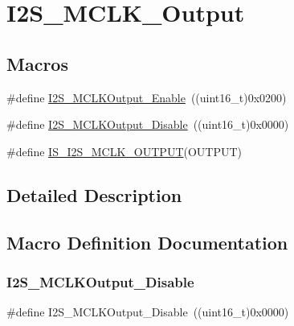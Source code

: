 \hypertarget{group___i2_s___m_c_l_k___output}{}\section{I2\+S\+\_\+\+M\+C\+L\+K\+\_\+\+Output}
\label{group___i2_s___m_c_l_k___output}
\subsection*{Macros}
\begin{DoxyCompactItemize}
\item 
\#define \mbox{\hyperlink{group___i2_s___m_c_l_k___output_ga99713ee8c824f4d3bb25a9ce7bf5312a}{I2\+S\+\_\+\+M\+C\+L\+K\+Output\+\_\+\+Enable}}~((uint16\+\_\+t)0x0200)
\item 
\#define \mbox{\hyperlink{group___i2_s___m_c_l_k___output_gaea09824d7e6359924152277ed3661e7e}{I2\+S\+\_\+\+M\+C\+L\+K\+Output\+\_\+\+Disable}}~((uint16\+\_\+t)0x0000)
\item 
\#define \mbox{\hyperlink{group___i2_s___m_c_l_k___output_ga829ae526d1d11f14592e881f800fbb8a}{I\+S\+\_\+\+I2\+S\+\_\+\+M\+C\+L\+K\+\_\+\+O\+U\+T\+P\+UT}}(O\+U\+T\+P\+UT)
\end{DoxyCompactItemize}


\subsection{Detailed Description}


\subsection{Macro Definition Documentation}
\mbox{\label{group___i2_s___m_c_l_k___output_gaea09824d7e6359924152277ed3661e7e}} 
\subsubsection{\texorpdfstring{I2S\_MCLKOutput\_Disable}{I2S\_MCLKOutput\_Disable}}
{\footnotesize\ttfamily \#define I2\+S\+\_\+\+M\+C\+L\+K\+Output\+\_\+\+Disable~((uint16\+\_\+t)0x0000)}

\mbox{\label{group___i2_s___m_c_l_k___output_ga99713ee8c824f4d3bb25a9ce7bf5312a}} 
